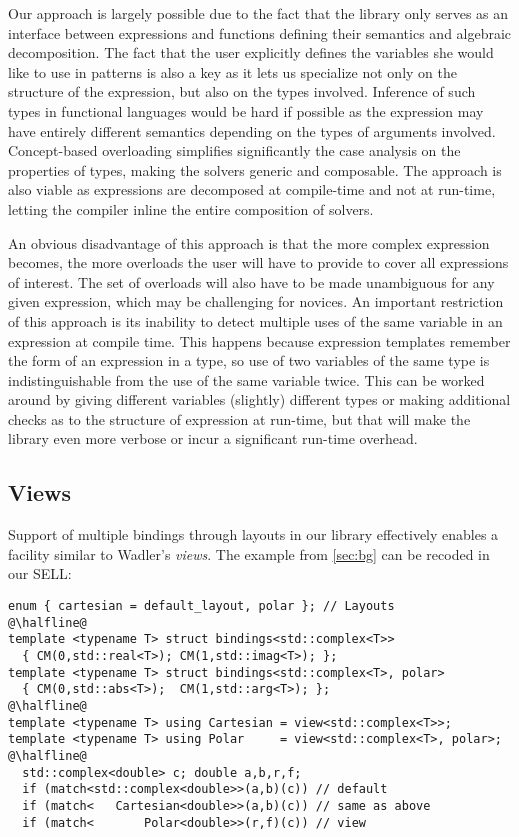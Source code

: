 \documentclass{llncs}
\begin{document}
Our approach is largely possible due to the fact that the library only serves as 
an interface between expressions and functions defining their semantics and 
algebraic decomposition. The fact that the user explicitly defines the variables 
she would like to use in patterns is also a key as it lets us specialize not 
only on the structure of the expression, but also on the types involved. 
Inference of such types in functional languages would be hard if possible as the 
expression may have entirely different semantics depending on the types of 
arguments involved. Concept-based overloading simplifies significantly the case 
analysis on the properties of types, making the solvers generic and composable.
The approach is also viable as expressions are decomposed at compile-time and 
not at run-time, letting the compiler inline the entire composition of solvers. 

An obvious disadvantage of this approach is that the more complex expression 
becomes, the more overloads the user will have to provide to cover all 
expressions of interest. The set of overloads will also have to be made 
unambiguous for any given expression, which may be challenging for novices. An 
important restriction of this approach is its inability to detect multiple uses 
of the same variable in an expression at compile time. This happens because 
expression templates remember the form of an expression in a type, so use of two 
variables of the same type is indistinguishable from the use of the same 
variable twice. This can be worked around by giving different variables 
(slightly) different types or making additional checks as to the structure of 
expression at run-time, but that will make the library even more verbose or 
incur a significant run-time overhead.

\subsection{Views}
\label{sec:view}

Support of multiple bindings through layouts in our library effectively enables 
a facility similar to Wadler's \emph{views}\cite{Wadler87}. The example from 
\textsection\ref{sec:bg} can be recoded in our SELL:

\begin{lstlisting}[keepspaces,columns=flexible]
enum { cartesian = default_layout, polar }; // Layouts
@\halfline@
template <typename T> struct bindings<std::complex<T>>
  { CM(0,std::real<T>); CM(1,std::imag<T>); };
template <typename T> struct bindings<std::complex<T>, polar>
  { CM(0,std::abs<T>);  CM(1,std::arg<T>); };
@\halfline@
template <typename T> using Cartesian = view<std::complex<T>>;
template <typename T> using Polar     = view<std::complex<T>, polar>;
@\halfline@
  std::complex<double> c; double a,b,r,f;
  if (match<std::complex<double>>(a,b)(c)) // default
  if (match<   Cartesian<double>>(a,b)(c)) // same as above
  if (match<       Polar<double>>(r,f)(c)) // view
\end{lstlisting}
\end{document}
